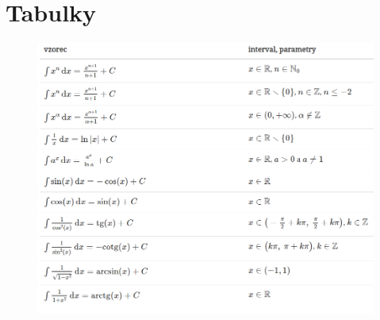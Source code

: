 \documentclass{szzclass}
\begin{document}
\newpage
\section{Tabulky}

\begin{figure}[h]
    \includegraphics[width=\textwidth, center]{topics/bi-spol-35/images/integraly.png}
\end{figure}
\end{document}
